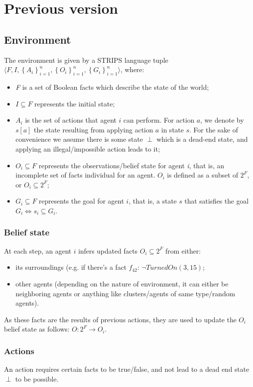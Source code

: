 \section{Previous version}
\subsection{Environment}
The environment is given by a STRIPS language \cite{fikes_strips_1971} tuple $\langle F, I, \left\{ A_i \right\}_{i=1}^n, \left\{ O_i \right\}_{i=1}^n, \left\{ G_i \right\}_{i=1}^n  \rangle$, where:
\begin{itemize}
    \item \textit{F} is a set of Boolean facts which describe the state of the world;
    \item $I \subseteq F$ represents the initial state;
    \item $A_i$ is the set of actions that agent $i$ can perform. For action $a$, we denote by $s[a]$ the state resulting from applying action $a$ in state $s$. For the sake of convenience we assume there is some state $\perp$ which is a dead-end state, and applying an illegal/impossible action leads to it;
    \item     $O_i \subseteq F$ represents the observations/belief state for agent \textit{i}, that is, an incomplete set of facts individual for an agent. $O_i$ is defined as a subset of $2^F$, or $O_i \subseteq 2^F$;
    \item $G_i \subseteq F$ represents the goal for agent $i$, that is, a state $s$ that satisfies the goal $G_i \iff s_i \subseteq G_i$. 

\end{itemize}
\subsubsection{Belief state}
At each step, an agent $i$ infers updated facts $O_i \subseteq 2^{F}$ from either:
\begin{itemize}
    \item its surroundings (e.g. if there's a fact $f_{42}$: $\neg TurnedOn(3, 15)$;
    \item       other agents (depending on the nature of environment, it can either be neighboring agents or anything like clusters/agents of same type/random agents).
\end{itemize}
As these facts are the results of previous actions, they are used to update the $O_i$ belief state as follows: $O: 2^F \to O_i$.
\subsubsection{Actions}
An action requires certain facts to be true/false, and not lead to a dead end state $\perp$ to be possible.

